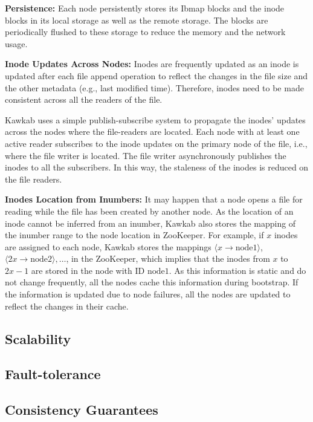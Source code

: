 \documentclass[]{article}
\newcommand{\subtopic}[1]{\vspace{1.5pt} \noindent \textbf{#1}}
\begin{document}
\subtopic{Persistence:} Each node persistently stores its Ibmap blocks and the
inode blocks in its local storage as well as the remote storage. The blocks are
periodically flushed to these storage to reduce the memory and the network usage.

\subtopic{Inode Updates Across Nodes:} Inodes are frequently updated as an inode is
updated after each file append operation to reflect the changes in the file
size and the other metadata (e.g., last modified time).  Therefore, inodes need
to be made consistent across all the readers of the file.

Kawkab uses a simple publish-subscribe system to propagate the inodes' updates
across the nodes where the file-readers are located. Each node with
at least one active reader subscribes to the inode updates on the primary node
of the file, i.e., where the file writer is located. The file writer 
asynchronously publishes the inodes to all the subscribers. In this way,
the staleness of the inodes is reduced on the file readers.


\subtopic{Inodes Location from Inumbers:} It may happen that a node opens a
file for reading while the file has been created by another node. As the
location of an inode cannot be inferred from an inumber, Kawkab also stores the
mapping of the inumber range to the node location in ZooKeeper.  For example,
if $x$ inodes are assigned to each node, Kawkab stores the mappings $\langle x
\to \mathrm{node1} \rangle$, $\langle 2x \to \mathrm{node2} \rangle, \ldots$,
in the ZooKeeper, which implies that the inodes from $x$ to $2x-1$ are stored
in the node with ID $\mathrm{node1}$. As this information is static and do not
change frequently, all the nodes cache this information during bootstrap. If
the information is updated due to node failures, all the nodes are updated to
reflect the changes in their cache.



\subsection{Scalability}

\subsection{Fault-tolerance}

\subsection{Consistency Guarantees}
\end{document}
